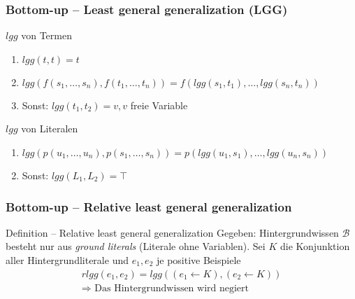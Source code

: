 \begin{frame}
	\frametitle{Bottom-up -- Least general generalization (LGG)}
	\begin{block}{$lgg$ von Termen}
		\begin{enumerate}
			\item $lgg(t,t) = t$\\
			\item $lgg(f(s_1, \ldots, s_n), f(t_1, \ldots, t_n)) = f(lgg(s_1, t_1), \ldots, lgg(s_n, t_n))$
			\item Sonst: $lgg(t_1, t_2) = v , v$ freie Variable
		\end{enumerate}
	\end{block}
	\begin{block}{$lgg$ von Literalen}
	\begin{enumerate}
		\item $lgg(p(u_1, \ldots, u_n), p(s_1, \ldots, s_n)) = p(lgg(u_1, s_1), \ldots, lgg(u_n, s_n))$\\
		\item Sonst: $lgg(L_1, L_2) = \top$
	\end{enumerate}
	\end{block}
\end{frame}


\begin{frame}
\frametitle{Bottom-up -- Relative least general generalization}
\begin{block}{Definition -- Relative least general generalization}
	Gegeben: Hintergrundwissen $\mathcal{B}$ besteht nur aus \emph{ground literals} (Literale ohne Variablen).
	Sei $K$ die Konjunktion aller Hintergrundliterale und $e_1, e_2$ je positive Beispiele
	\begin{align*}
		rlgg(e_1, e_2) = lgg((e_1 \leftarrow K), (e_2 \leftarrow K))\\
		\Rightarrow \text{ Das Hintergrundwissen wird negiert}
	\end{align*}
\end{block}

\end{frame}


